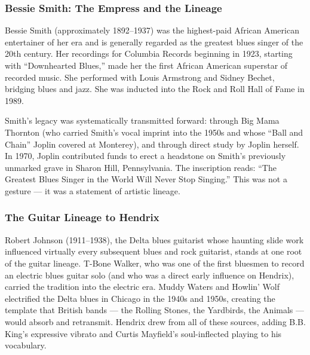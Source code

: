 \documentclass[11pt,letterpaper]{article}
\begin{document}
\subsubsection{Bessie Smith: The Empress and the Lineage}

Bessie Smith (approximately 1892--1937) was the highest-paid African American entertainer of her era and is generally regarded as the greatest blues singer of the 20th century. Her recordings for Columbia Records beginning in 1923, starting with ``Downhearted Blues,'' made her the first African American superstar of recorded music. She performed with Louis Armstrong and Sidney Bechet, bridging blues and jazz. She was inducted into the Rock and Roll Hall of Fame in 1989.

Smith's legacy was systematically transmitted forward: through Big Mama Thornton (who carried Smith's vocal imprint into the 1950s and whose ``Ball and Chain'' Joplin covered at Monterey), and through direct study by Joplin herself. In 1970, Joplin contributed funds to erect a headstone on Smith's previously unmarked grave in Sharon Hill, Pennsylvania. The inscription reads: ``The Greatest Blues Singer in the World Will Never Stop Singing.'' This was not a gesture --- it was a statement of artistic lineage.

\subsubsection{The Guitar Lineage to Hendrix}

Robert Johnson (1911--1938), the Delta blues guitarist whose haunting slide work influenced virtually every subsequent blues and rock guitarist, stands at one root of the guitar lineage. T-Bone Walker, who was one of the first bluesmen to record an electric blues guitar solo (and who was a direct early influence on Hendrix), carried the tradition into the electric era. Muddy Waters and Howlin' Wolf electrified the Delta blues in Chicago in the 1940s and 1950s, creating the template that British bands --- the Rolling Stones, the Yardbirds, the Animals --- would absorb and retransmit. Hendrix drew from all of these sources, adding B.B. King's expressive vibrato and Curtis Mayfield's soul-inflected playing to his vocabulary.
\end{document}
